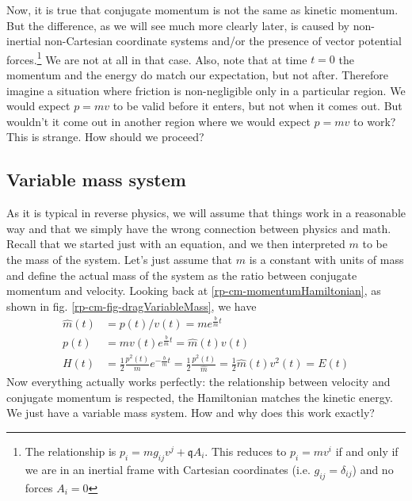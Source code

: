Now, it is true that conjugate momentum is not the same as kinetic momentum. But the difference, as we will see much more clearly later, is caused by non-inertial non-Cartesian coordinate systems and/or the presence of vector potential forces.\footnote{The relationship is $p_i = m g_{ij} v^j + \mathfrak{q} A_i$. This reduces to $p_i = m v^i$ if and only if we are in an inertial frame with Cartesian coordinates (i.e. $g_{ij}=\delta_{ij}$) and no forces $A_i = 0$} We are not at all in that case. Also, note that at time $t=0$ the momentum and the energy do match our expectation, but not after. Therefore imagine a situation where friction is non-negligible only in a particular region. We would expect $p=mv$ to be valid before it enters, but not when it comes out. But wouldn't it come out in another region where we would expect $p=mv$ to work? This is strange. How should we proceed?

\subsection{Variable mass system}

As it is typical in reverse physics, we will assume that things work in a reasonable way and that we simply have the wrong connection between physics and math. Recall that we started just with an equation, and we then interpreted $m$ to be the mass of the system. Let's just assume that $m$ is a constant with units of mass and define the actual mass of the system as the ratio between conjugate momentum and velocity. Looking back at \ref{rp-cm-momentumHamiltonian}, as shown in fig. \ref{rp-cm-fig-dragVariableMass}, we have 
\begin{equation}
	\begin{aligned}
	\hat{m}(t) &= p(t) / v(t) = m e^{\frac{b}{m}t} \\
	p(t) &= mv(t)e^{\frac{b}{m}t} = \hat{m}(t) v(t) \\
	H(t) &= \frac{1}{2} \frac{p^2(t)}{m}  e^{-\frac{b}{m}t} = \frac{1}{2} \frac{p^2(t)}{\hat{m}} = \frac{1}{2} \hat{m}(t) v^2(t) = E(t)
	\end{aligned}
\end{equation}
Now everything actually works perfectly: the relationship between velocity and conjugate momentum is respected, the Hamiltonian matches the kinetic energy. We just have a variable mass system. How and why does this work exactly?

